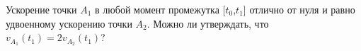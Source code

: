 Ускорение точки $A_{1}$ в любой момент промежутка [$t_{0}$,$t_{1}$]
отлично от нуля и равно удвоенному ускорению точки $A_{2}$. Можно ли 
утверждать, что $v_{A_{1}}(t_{1})=2v_{A_{2}}(t_{1})$?
